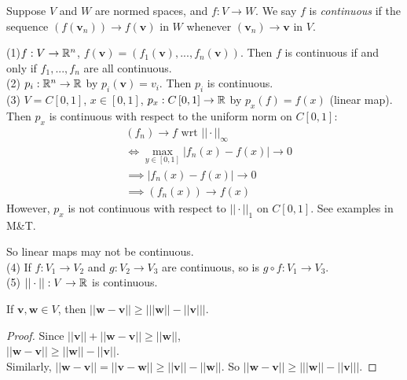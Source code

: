 \documentclass[a4paper]{article}
\begin{document}
\begin{defi}
Suppose $V$ and $W$ are normed spaces, and $f:V\to W$. We say $f$ is \emph{continuous} if the sequence $\left(f\left(\mathbf{v}_n\right)\right) \to f\left(\mathbf{v}\right)$ in $W$ whenever $\left(\mathbf{v}_n\right) \to \mathbf{v}$ in $V$.

\begin{eg}
(1)$f:V \to \mathbb{R}^n$, $f\left(\mathbf{v}\right) = \left(f_1\left(\mathbf{v}\right),...,f_n\left(\mathbf{v}\right)\right)$. Then $f$ is continuous if and only if $f_1,...,f_n$ are all continuous.\\
(2) $p_i:\mathbb{R}^n \to \mathbb{R}$ by $p_i\left(\mathbf{v}\right) = v_i$. Then $p_i$ is continuous.\\
(3) $V=C\left[0,1\right]$, $x\in \left[0,1\right]$, $p_x:C\left[0,1\right]\to \mathbb{R}$ by $p_x\left(f\right) = f\left(x\right)$ (linear map). Then $p_x$ is continuous with respect to the uniform norm on $C\left[0,1\right]$:\\
\begin{equation*}
\begin{aligned}
&\left(f_n\right) \to f \text{ wrt } ||\cdot||_\infty\\
&\iff \max_{y\in\left[0,1\right]} |f_n\left(x\right) - f\left(x\right) | \to 0\\
&\implies |f_n\left(x\right)-f\left(x\right)| \to 0\\
&\implies \left(f_n\left(x\right)\right) \to f\left(x\right)
\end{aligned}
\end{equation*}
However, $p_x$ is not continuous with respect to $||\cdot||_1$ on $C\left[0,1\right]$. See examples in M\&T.
\end{eg}
So linear maps may not be continuous.\\
(4) If $f:V_1 \to V_2$ and $g:V_2\to V_3$ are continuous, so is $g\circ f: V_1 \to V_3$.\\
(5) $||\cdot||: V\to \mathbb{R}$ is continuous.
\end{defi}

\begin{lemma}
If $\mathbf{v},\mathbf{w}\in V$, then $||\mathbf{w}-\mathbf{v}|| \geq \left| ||\mathbf{w}|| - ||\mathbf{v}|| \right|$.
\begin{proof}
Since $||\mathbf{v}|| + ||\mathbf{w}-\mathbf{v}|| \geq ||\mathbf{w}||$,\\
$||\mathbf{w}-\mathbf{v}|| \geq ||\mathbf{w}|| - ||\mathbf{v}||$.\\
Similarly, $||\mathbf{w}-\mathbf{v}|| = ||\mathbf{v}-\mathbf{w}|| \geq ||\mathbf{v}||-||\mathbf{w}||$. So $||\mathbf{w}-\mathbf{v}|| \geq \left| ||\mathbf{w}|| - ||\mathbf{v}|| \right|$.
\end{proof}
\end{lemma}
\end{document}
